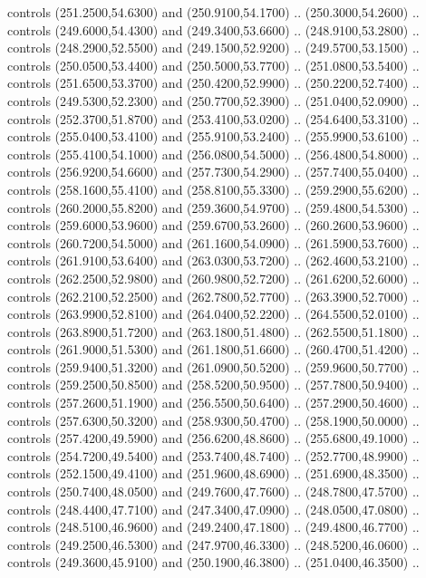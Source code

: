{\begin{scope}[y=0.80pt, x=0.80pt, yscale=-1, xscale=1, inner sep=0pt, outer sep=0pt, #1]
      controls (251.2500,54.6300) and (250.9100,54.1700) .. (250.3000,54.2600) ..
      controls (249.6000,54.4300) and (249.3400,53.6600) .. (248.9100,53.2800) ..
      controls (248.2900,52.5500) and (249.1500,52.9200) .. (249.5700,53.1500) ..
      controls (250.0500,53.4400) and (250.5000,53.7700) .. (251.0800,53.5400) ..
      controls (251.6500,53.3700) and (250.4200,52.9900) .. (250.2200,52.7400) ..
      controls (249.5300,52.2300) and (250.7700,52.3900) .. (251.0400,52.0900) ..
      controls (252.3700,51.8700) and (253.4100,53.0200) .. (254.6400,53.3100) ..
      controls (255.0400,53.4100) and (255.9100,53.2400) .. (255.9900,53.6100) ..
      controls (255.4100,54.1000) and (256.0800,54.5000) .. (256.4800,54.8000) ..
      controls (256.9200,54.6600) and (257.7300,54.2900) .. (257.7400,55.0400) ..
      controls (258.1600,55.4100) and (258.8100,55.3300) .. (259.2900,55.6200) ..
      controls (260.2000,55.8200) and (259.3600,54.9700) .. (259.4800,54.5300) ..
      controls (259.6000,53.9600) and (259.6700,53.2600) .. (260.2600,53.9600) ..
      controls (260.7200,54.5000) and (261.1600,54.0900) .. (261.5900,53.7600) ..
      controls (261.9100,53.6400) and (263.0300,53.7200) .. (262.4600,53.2100) ..
      controls (262.2500,52.9800) and (260.9800,52.7200) .. (261.6200,52.6000) ..
      controls (262.2100,52.2500) and (262.7800,52.7700) .. (263.3900,52.7000) ..
      controls (263.9900,52.8100) and (264.0400,52.2200) .. (264.5500,52.0100) ..
      controls (263.8900,51.7200) and (263.1800,51.4800) .. (262.5500,51.1800) ..
      controls (261.9000,51.5300) and (261.1800,51.6600) .. (260.4700,51.4200) ..
      controls (259.9400,51.3200) and (261.0900,50.5200) .. (259.9600,50.7700) ..
      controls (259.2500,50.8500) and (258.5200,50.9500) .. (257.7800,50.9400) ..
      controls (257.2600,51.1900) and (256.5500,50.6400) .. (257.2900,50.4600) ..
      controls (257.6300,50.3200) and (258.9300,50.4700) .. (258.1900,50.0000) ..
      controls (257.4200,49.5900) and (256.6200,48.8600) .. (255.6800,49.1000) ..
      controls (254.7200,49.5400) and (253.7400,48.7400) .. (252.7700,48.9900) ..
      controls (252.1500,49.4100) and (251.9600,48.6900) .. (251.6900,48.3500) ..
      controls (250.7400,48.0500) and (249.7600,47.7600) .. (248.7800,47.5700) ..
      controls (248.4400,47.7100) and (247.3400,47.0900) .. (248.0500,47.0800) ..
      controls (248.5100,46.9600) and (249.2400,47.1800) .. (249.4800,46.7700) ..
      controls (249.2500,46.5300) and (247.9700,46.3300) .. (248.5200,46.0600) ..
      controls (249.3600,45.9100) and (250.1900,46.3800) .. (251.0400,46.3500) ..

\end{scope}}
